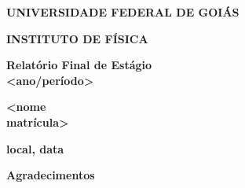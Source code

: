 \documentclass[12pt,a4paper]{article}
\begin{document}
    \begin{titlepage}

        \begin{center}
            \begin{Large}
                \textbf{UNIVERSIDADE FEDERAL DE GOIÁS}
            
                \textbf{INSTITUTO DE FÍSICA} 
            \end{Large}
        \end{center}
   
   
    \vspace*{5cm}

    \begin{center}
      \begin{Large}
         \textbf{Relatório Final de Estágio\\
         \vspace{0.5cm}
         <ano/período>}
      \end{Large}
       
    \end{center}
      
    \vspace{5cm}  
      
    \begin{center}
    \begin{Large}
        \textbf{<nome \\
        \vspace{0.5cm}
        matrícula>}
    \end{Large}
       
    \end{center}
    
    \vspace{4cm}
    
    \begin{center}
    \begin{large}
        \textbf{local, data}
    \end{large}
        
    \end{center}
    
    

    \end{titlepage}



\begin{center}
\Large{\textbf{ Agradecimentos}} %
\end{center}
\end{document}
